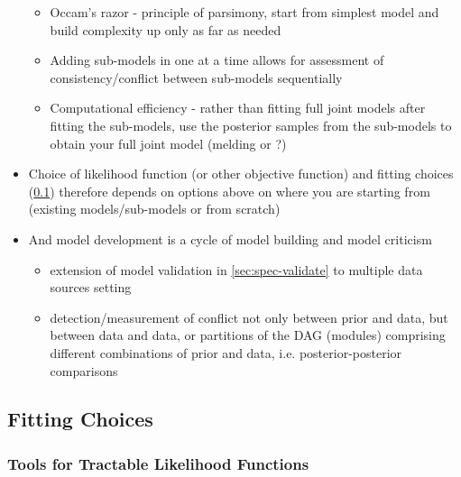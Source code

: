 \documentclass{article}
\begin{document}
\begin{itemize}
\begin{itemize}
        \item Occam's razor - principle of parsimony, start from simplest model and build complexity up only as far as needed
        \item Adding sub-models in one at a time allows for assessment of consistency/conflict between sub-models sequentially
        \item Computational efficiency - rather than fitting full joint models after fitting the sub-models, use the posterior samples from the sub-models to obtain your full joint model (melding or ?)
    \end{itemize}
    \item Choice of likelihood function (or other objective function) and fitting choices (\ref{sec:fitting}) therefore depends on options above on where you are starting from (existing models/sub-models or from scratch)
    \item And model development is a cycle of model building and model criticism
    \begin{itemize}
        \item extension of model validation in \ref{sec:spec-validate} to multiple data sources setting
        \item detection/measurement of conflict not only between prior and data, but between data and data, or partitions of the DAG (modules) comprising different combinations of prior and data, i.e. posterior-posterior comparisons
    \end{itemize}
\end{itemize}


\subsection{Fitting Choices}\label{sec:fitting}

\subsubsection{Tools for Tractable Likelihood Functions}
\end{document}
